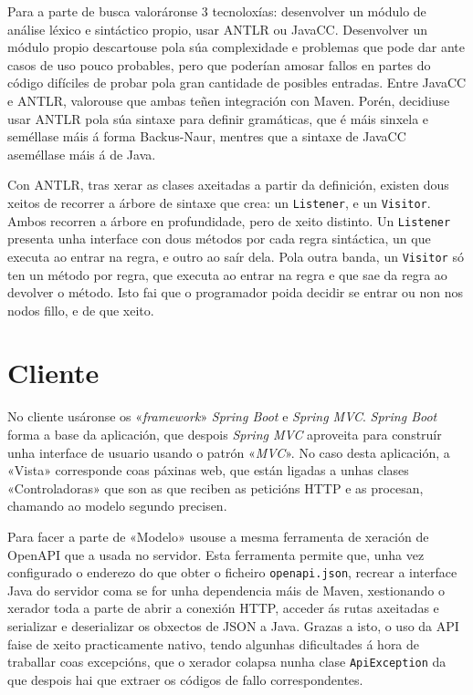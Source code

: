 Para a parte de busca valoráronse 3 tecnoloxías: desenvolver un módulo de análise léxico e sintáctico propio, usar ANTLR\cite{antlr} ou JavaCC\cite{javacc}. Desenvolver un módulo propio descartouse pola súa complexidade e problemas que pode dar ante casos de uso pouco probables, pero que poderían amosar fallos en partes do código difíciles de probar pola gran cantidade de posibles entradas. Entre JavaCC e ANTLR, valorouse que ambas teñen integración con Maven. Porén, decidiuse usar ANTLR pola súa sintaxe para definir gramáticas, que é máis sinxela e seméllase máis á forma Backus-Naur, mentres que a sintaxe de JavaCC aseméllase máis á de Java.

Con ANTLR, tras xerar as clases axeitadas a partir da definición, existen dous xeitos de recorrer a árbore de sintaxe que crea\cite{visitor}: un \texttt{Listener}, e un \texttt{Visitor}. Ambos recorren a árbore en profundidade, pero de xeito distinto. Un \texttt{Listener} presenta unha interface con dous métodos por cada regra sintáctica, un que executa ao entrar na regra, e outro ao saír dela. Pola outra banda, un \texttt{Visitor} só ten un método por regra, que executa ao entrar na regra e que sae da regra ao devolver o método. Isto fai que o programador poida decidir se entrar ou non nos nodos fillo, e de que xeito.

\section{Cliente}

No cliente usáronse os «\textit{framework}» \textit{Spring Boot} e \textit{Spring MVC}. \textit{Spring Boot} forma a base da aplicación, que despois \textit{Spring MVC} aproveita para construír unha interface de usuario usando o patrón «\textit{\acrlong{MVC}}». No caso desta aplicación, a «Vista» corresponde coas páxinas web, que están ligadas a unhas clases «Controladoras» que son as que reciben as peticións HTTP e as procesan, chamando ao modelo segundo precisen.

Para facer a parte de «Modelo» usouse a mesma ferramenta de xeración de OpenAPI que a usada no servidor. Esta ferramenta permite que, unha vez configurado o enderezo do que obter o ficheiro \texttt{openapi.json}, recrear a interface Java do servidor coma se for unha dependencia máis de Maven, xestionando o xerador toda a parte de abrir a conexión HTTP, acceder ás rutas axeitadas e serializar e deserializar os obxectos de JSON a Java. Grazas a isto, o uso da API faise de xeito practicamente nativo, tendo algunhas dificultades á hora de traballar coas excepcións, que o xerador colapsa nunha clase \texttt{ApiException} da que despois hai que extraer os códigos de fallo correspondentes.


